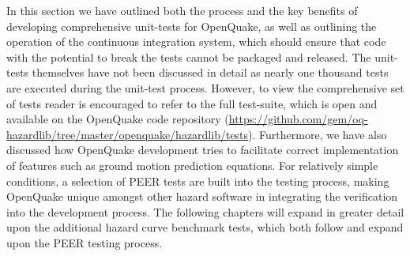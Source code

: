 In this section we have outlined both the process and the key benefits of developing comprehensive unit-tests for OpenQuake, as well as outlining the operation of the continuous integration system, which should ensure that code with the potential to break the tests cannot be packaged and released. The unit-tests themselves have not been discussed in detail as nearly one thousand tests are executed during the unit-test process. However, to view the comprehensive set of tests reader is encouraged to refer to the full test-suite, which is open and available on the OpenQuake code repository (\href{https://github.com/gem/oq-hazardlib/tree/master/openquake/hazardlib/tests}{https://github.com/gem/oq-hazardlib/tree/master/openquake/hazardlib/tests}). Furthermore, we have also discussed how OpenQuake development tries to facilitate correct implementation of features such as ground motion prediction equations. For relatively simple conditions, a selection of PEER tests \citep{thomas2010} are built into the testing process, making OpenQuake unique amongst other hazard software in integrating the verification into the development process. The following chapters will expand in greater detail upon the additional hazard curve benchmark tests, which both follow and expand upon the PEER testing process. 


